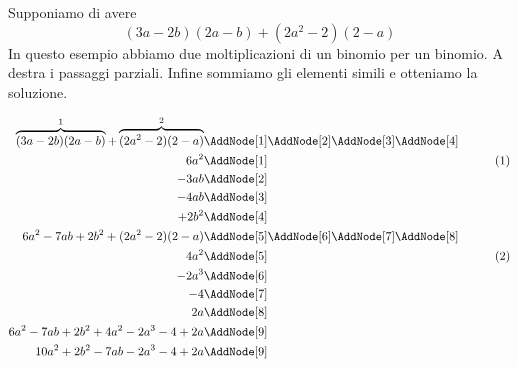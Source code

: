 \begin{esempio}
Supponiamo di avere \[(3a-2b)(2a-b)+(2a^2-2)(2-a)\]
 In questo esempio abbiamo due moltiplicazioni di un binomio per un binomio. A destra i passaggi parziali. Infine sommiamo  gli elementi simili e otteniamo la soluzione.
 \begin{NodesList}
 	\begin{align*}
 		\overbrace{(3a-2b)(2a-b)}^{1}+\overbrace{(2a^2-2)(2-a)}^{2}&\nonumber\AddNode[1]\AddNode[2]\AddNode[3]\AddNode[4]\\
 		6a^2&\AddNode[1]&\tag{1}\\ 
 		-3ab&\AddNode[2]&\\
 		-4ab&\AddNode[3]&\\    
 		+2b^2&\AddNode[4]&\\
 		6a^2-7ab+2b^2+(2a^2-2)(2-a)&\nonumber\AddNode[5]\AddNode[6]\AddNode[7]\AddNode[8]\\
 		4a^2&\AddNode[5]&\tag{2}\\
 		-2a^3&\AddNode[6]&\\
 		-4 &\AddNode[7]&\\   
 		2a&\AddNode[8]&\\   
 		6a^2-7ab+2b^2+4a^2-2a^3-4+2a&\nonumber\AddNode[9]\\
 		10a^2+2b^2-7ab-2a^3-4+2a&\nonumber\AddNode[9]
 	\end{align*}
 \end{NodesList}
\end{esempio}

